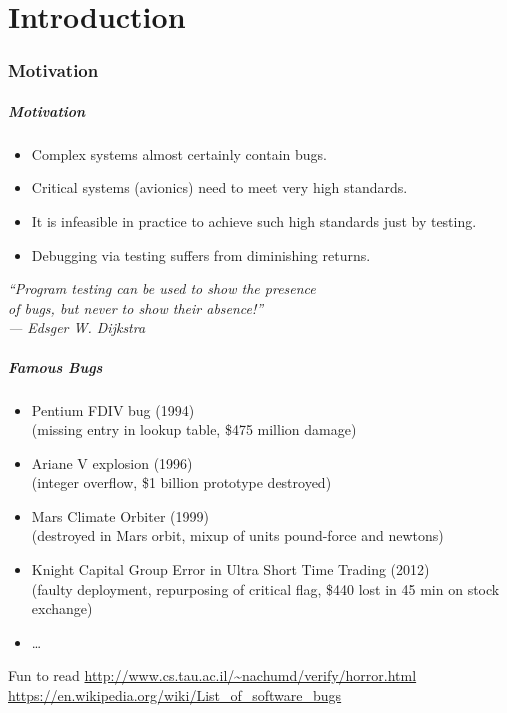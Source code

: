 \part{Introduction}

\frame[plain]{\partpage}

\section{Motivation}

\begin{frame}
\frametitle{Motivation}
\begin{itemize}
\item Complex systems almost certainly contain bugs.
\item Critical systems (\eg avionics) need to meet very high standards.
\item It is infeasible in practice to achieve such high standards just by testing.
\item Debugging via testing suffers from diminishing returns.
\end{itemize}
\bigskip

\begin{raggedleft}
\emph{``Program testing can be used to show the presence\\ 
of bugs, but never to show their absence!''\\
--- Edsger W. Dijkstra\\}
\end{raggedleft}

\end{frame}

\begin{frame}
\frametitle{Famous Bugs}
\begin{itemize}
\item Pentium FDIV bug (1994)\\(missing entry in lookup table, \$475 million damage)
\item Ariane V explosion (1996)\\(integer overflow, \$1 billion prototype destroyed)
\item Mars Climate Orbiter (1999)\\(destroyed in Mars orbit, mixup of units pound-force and newtons)
\item Knight Capital Group Error in Ultra Short Time Trading (2012)\\
(faulty deployment, repurposing of critical flag, \$440 lost in 45 min on stock exchange)
\item \ldots
\end{itemize}

\begin{block}{Fun to read}
\url{http://www.cs.tau.ac.il/~nachumd/verify/horror.html}
\url{https://en.wikipedia.org/wiki/List_of_software_bugs}
\end{block}

\end{frame}


